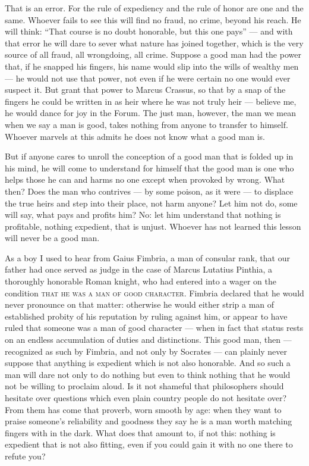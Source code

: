  That is an error. For the rule of expediency and the rule of honor are one and the same. Whoever fails to see this will find no fraud, no crime, beyond his reach. He will think: ``That course is no doubt honorable, but this one pays'' — and with that error he will dare to sever what nature has joined together, which is the very source of all fraud, all wrongdoing, all crime. Suppose a good man had the power that, if he snapped his fingers, his name would slip into the wills of wealthy men — he would not use that power, not even if he were certain no one would ever suspect it. But grant that power to Marcus Crassus, so that by a snap of the fingers he could be written in as heir where he was not truly heir — believe me, he would dance for joy in the Forum. The just man, however, the man we mean when we say a man is good, takes nothing from anyone to transfer to himself. Whoever marvels at this admits he does not know what a good man is.

 But if anyone cares to unroll the conception of a good man that is folded up in his mind, he will come to understand for himself that the good man is one who helps those he can and harms no one except when provoked by wrong. What then? Does the man who contrives — by some poison, as it were — to displace the true heirs and step into their place, not harm anyone? Let him not do, some will say, what pays and profits him? No: let him understand that nothing is profitable, nothing expedient, that is unjust. Whoever has not learned this lesson will never be a good man.

 As a boy I used to hear from Gaius Fimbria, a man of consular rank, that our father had once served as judge in the case of Marcus Lutatius Pinthia, a thoroughly honorable Roman knight, who had entered into a wager on the condition \textsc{that he was a man of good character}. Fimbria declared that he would never pronounce on that matter: otherwise he would either strip a man of established probity of his reputation by ruling against him, or appear to have ruled that someone was a man of good character — when in fact that status rests on an endless accumulation of duties and distinctions. This good man, then — recognized as such by Fimbria, and not only by Socrates — can plainly never suppose that anything is expedient which is not also honorable. And so such a man will dare not only to do nothing but even to think nothing that he would not be willing to proclaim aloud. Is it not shameful that philosophers should hesitate over questions which even plain country people do not hesitate over? From them has come that proverb, worn smooth by age: when they want to praise someone's reliability and goodness they say he is a man worth matching fingers with in the dark. What does that amount to, if not this: nothing is expedient that is not also fitting, even if you could gain it with no one there to refute you?

